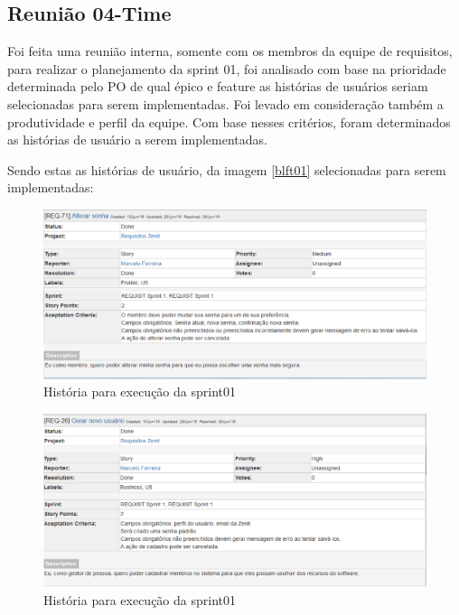 \subsection{Reunião 04-Time}

Foi feita uma reunião interna, somente com os membros da equipe de requisitos, para realizar o planejamento da sprint 01, foi analisado com base na prioridade determinada pelo PO de qual épico e feature as histórias de usuários seriam selecionadas para serem implementadas. Foi levado em consideração também a produtividade e perfil da equipe. Com base nesses critérios, foram determinados as histórias de usuário a serem implementadas. 

Sendo estas as histórias de usuário, da imagem \ref{blft01} selecionadas para serem implementadas: 


\begin{figure}[H]
    \centering
    \includegraphics[keepaspectratio=true,scale=0.6]{figuras/us01.eps}
    \caption[História da sprint 01]{História para execução da sprint01}
\end{figure}

\begin{figure}[H]
    \centering
    \includegraphics[keepaspectratio=true,scale=0.6]{figuras/us02.eps}
    \caption[História da sprint 01]{História para execução da sprint01}
\end{figure}

